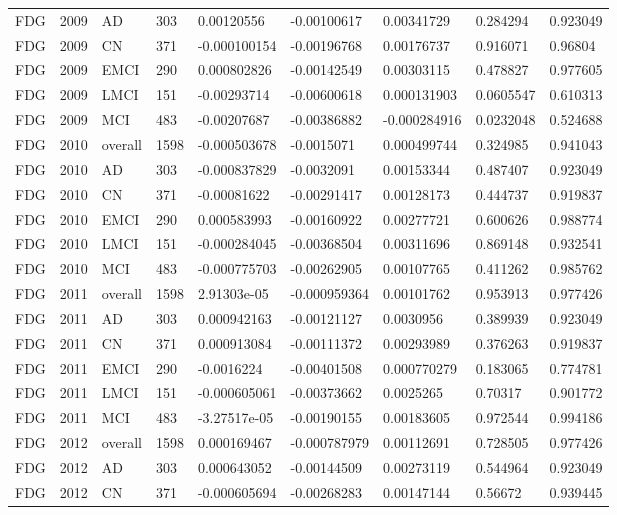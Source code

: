 \begin{landscape}
\begin{longtable}{lllllllll}
FDG & 2009 & AD & 303 & 0.00120556 & -0.00100617 & 0.00341729 & 0.284294 & 0.923049 \\
FDG & 2009 & CN & 371 & -0.000100154 & -0.00196768 & 0.00176737 & 0.916071 & 0.96804 \\
FDG & 2009 & EMCI & 290 & 0.000802826 & -0.00142549 & 0.00303115 & 0.478827 & 0.977605 \\
FDG & 2009 & LMCI & 151 & -0.00293714 & -0.00600618 & 0.000131903 & 0.0605547 & 0.610313 \\
FDG & 2009 & MCI & 483 & -0.00207687 & -0.00386882 & -0.000284916 & 0.0232048 & 0.524688 \\
FDG & 2010 & overall & 1598 & -0.000503678 & -0.0015071 & 0.000499744 & 0.324985 & 0.941043 \\
FDG & 2010 & AD & 303 & -0.000837829 & -0.0032091 & 0.00153344 & 0.487407 & 0.923049 \\
FDG & 2010 & CN & 371 & -0.00081622 & -0.00291417 & 0.00128173 & 0.444737 & 0.919837 \\
FDG & 2010 & EMCI & 290 & 0.000583993 & -0.00160922 & 0.00277721 & 0.600626 & 0.988774 \\
FDG & 2010 & LMCI & 151 & -0.000284045 & -0.00368504 & 0.00311696 & 0.869148 & 0.932541 \\
FDG & 2010 & MCI & 483 & -0.000775703 & -0.00262905 & 0.00107765 & 0.411262 & 0.985762 \\
FDG & 2011 & overall & 1598 & 2.91303e-05 & -0.000959364 & 0.00101762 & 0.953913 & 0.977426 \\
FDG & 2011 & AD & 303 & 0.000942163 & -0.00121127 & 0.0030956 & 0.389939 & 0.923049 \\
FDG & 2011 & CN & 371 & 0.000913084 & -0.00111372 & 0.00293989 & 0.376263 & 0.919837 \\
FDG & 2011 & EMCI & 290 & -0.0016224 & -0.00401508 & 0.000770279 & 0.183065 & 0.774781 \\
FDG & 2011 & LMCI & 151 & -0.000605061 & -0.00373662 & 0.0025265 & 0.70317 & 0.901772 \\
FDG & 2011 & MCI & 483 & -3.27517e-05 & -0.00190155 & 0.00183605 & 0.972544 & 0.994186 \\
FDG & 2012 & overall & 1598 & 0.000169467 & -0.000787979 & 0.00112691 & 0.728505 & 0.977426 \\
FDG & 2012 & AD & 303 & 0.000643052 & -0.00144509 & 0.00273119 & 0.544964 & 0.923049 \\
FDG & 2012 & CN & 371 & -0.000605694 & -0.00268283 & 0.00147144 & 0.56672 & 0.939445 \\

\end{longtable}
\end{landscape}
